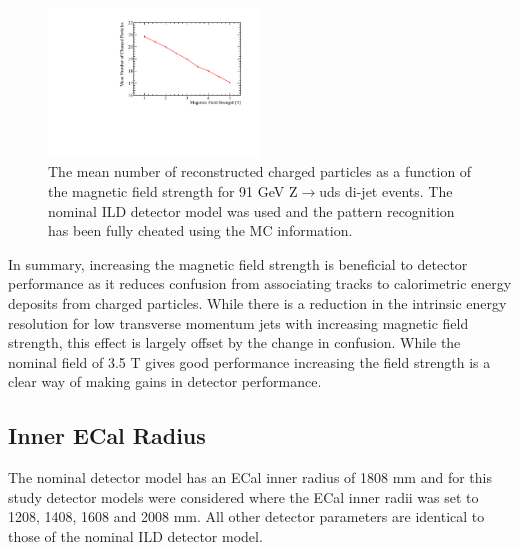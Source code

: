 \begin{figure}
\includegraphics[width=0.5\textwidth]{OptimisationStudies/Plots/Description/BField/BFieldNumbers_91GeV_Z_uds.pdf}
\caption[The mean number of reconstructed charged particles as a function of the magnetic field strength for 91 GeV Z$\rightarrow$uds di-jet events.  The nominal ILD detector model was used and the pattern recognition has been fully cheated using the MC information.]{The mean number of reconstructed charged particles as a function of the magnetic field strength for 91 GeV Z$\rightarrow$uds di-jet events.  The nominal ILD detector model was used and the pattern recognition has been fully cheated using the MC information.}
\label{fig:bfieldchargedparticles}
\end{figure}

In summary, increasing the magnetic field strength is beneficial to detector performance as it reduces confusion from associating tracks to calorimetric energy deposits from charged particles.  While there is a reduction in the intrinsic energy resolution for low transverse momentum jets with increasing magnetic field strength, this effect is largely offset by the change in confusion.  While the nominal field of 3.5 T gives good performance increasing the field strength is a clear way of making gains in detector performance.


\subsection{Inner ECal Radius}
The nominal detector model has an ECal inner radius of 1808 mm and for this study detector models were considered where the ECal inner radii was set to 1208, 1408, 1608 and 2008 mm.  All other detector parameters are identical to those of the nominal ILD detector model.

